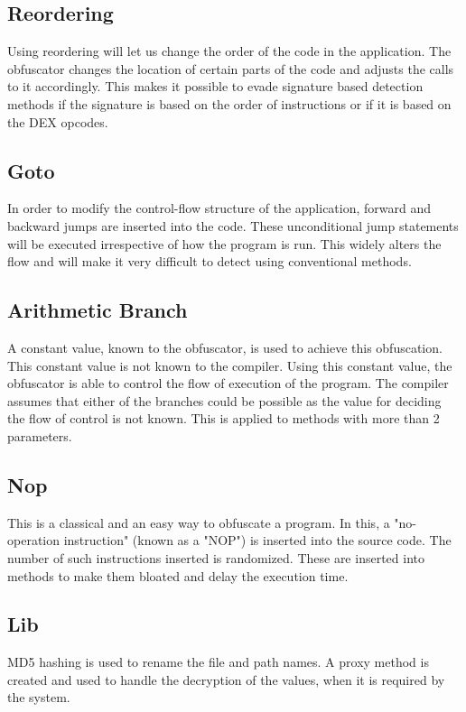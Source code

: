 \subsection{Reordering}
Using reordering will let us change the order of the code in the application. The obfuscator changes the location of certain parts of the code and adjusts the calls to it accordingly.  This makes it possible to evade signature based detection methods if the signature is based on the order of instructions or if it is based on the DEX opcodes.

\subsection{Goto}
In order to modify the control-flow structure of the application, forward and backward jumps are inserted into the code. These unconditional jump statements will be executed irrespective of how the program is run. This widely alters the flow and will make it very difficult to detect using conventional methods.

\subsection{Arithmetic Branch}
A constant value, known to the obfuscator, is used to achieve this obfuscation. This constant value is not known to the compiler. Using this constant value, the obfuscator is able to control the flow of execution of the program. The compiler assumes that either of the branches could be possible as the value for deciding the flow of control is not known. This is applied to methods with more than 2 parameters.

\subsection{Nop}
This is a classical and an easy way to obfuscate a program. In this, a "no-operation instruction" (known as a "NOP") is inserted into the source code. The number of such instructions inserted is randomized. These are inserted into methods to make them bloated and delay the execution time.

\subsection{Lib}
MD5 hashing is used to rename the file and path names.  A proxy method is created and used to handle the decryption of the values, when it is required by the system.


